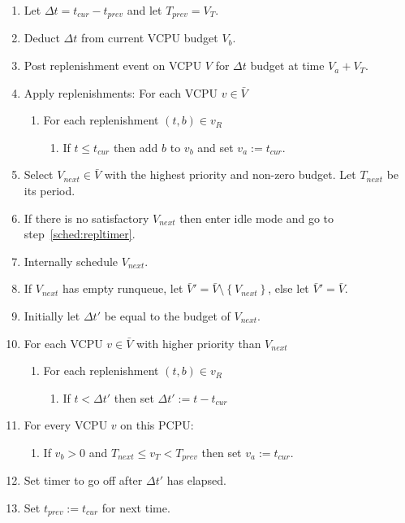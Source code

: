 \documentclass{article}
\newcommand\set[1]{\left\{ {#1} \right\}}
\begin{document}
\begin{enumerate}
\item Let $\Delta t=t_{cur}-t_{prev}$ and let $T_{prev}=V_T$.
\item Deduct $\Delta t$ from current VCPU budget $V_b$.
\item Post replenishment event on VCPU $V$ for $\Delta t$ budget at time $V_a+V_T$.
\item Apply replenishments: For each VCPU $v\in\bar V$
  \begin{enumerate}
  \item For each replenishment $(t,b)\in v_R$
    \begin{enumerate}
    \item If $t\leq t_{cur}$ then add $b$ to $v_b$ and set $v_a:=t_{cur}$.
    \end{enumerate}
  \end{enumerate}
\item Select $V_{next}\in\bar V$ with the highest priority and non-zero budget.  Let $T_{next}$ be its period.
\item If there is no satisfactory $V_{next}$ then enter idle mode and go to step~\ref{sched:repltimer}.
\item Internally schedule $V_{next}$.
\item If $V_{next}$ has empty runqueue, let $\bar V'=\bar V\setminus\set{V_{next}}$, else let $\bar V'=\bar V$.
\item Initially let $\Delta t'$ be equal to the budget of $V_{next}$.
\item \label{sched:repltimer} For each VCPU $v\in\bar V$ with higher priority than $V_{next}$
  \begin{enumerate}
  \item For each replenishment $(t,b)\in v_R$
    \begin{enumerate}
    \item If $t < \Delta t'$ then set $\Delta t':= t - t_{cur}$
    \end{enumerate}
  \end{enumerate}
\item For every VCPU $v$ on this PCPU:
  \begin{enumerate}
  \item If $v_b>0$ and $T_{next}\leq v_T < T_{prev}$ then set $v_a:=t_{cur}$.
  \end{enumerate}
\item Set timer to go off after $\Delta t'$ has elapsed.
\item Set $t_{prev}:=t_{cur}$ for next time.
\end{enumerate}
\end{document}
